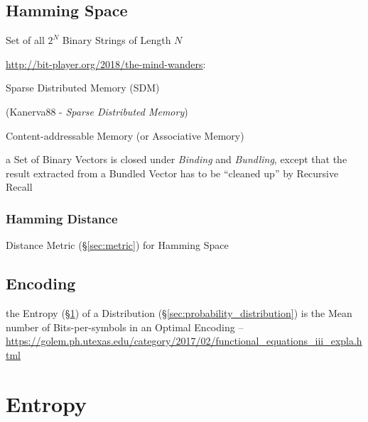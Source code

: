 \subsection{Hamming Space}\label{sec:hamming_space}

Set of all $2^N$ Binary Strings of Length $N$


\url{http://bit-player.org/2018/the-mind-wanders}:

Sparse Distributed Memory (SDM)

(Kanerva88 - \emph{Sparse Distributed Memory})

Content-addressable Memory (or Associative Memory)

a Set of Binary Vectors is closed under \emph{Binding} and \emph{Bundling},
except that the result extracted from a Bundled Vector has to be ``cleaned up''
by Recursive Recall



\subsubsection{Hamming Distance}\label{sec:hamming_distance}

Distance Metric (\S\ref{sec:metric}) for Hamming Space



\subsection{Encoding}\label{sec:encoding}

the Entropy (\S\ref{sec:entropy}) of a Distribution
(\S\ref{sec:probability_distribution}) is the Mean number of
Bits-per-symbols in an Optimal Encoding --
\url{https://golem.ph.utexas.edu/category/2017/02/functional_equations_iii_expla.html}



\section{Entropy}\label{sec:entropy}

